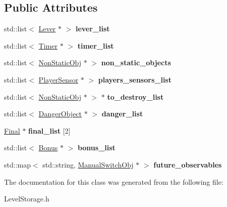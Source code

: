 \subsection*{Public Attributes}
\begin{DoxyCompactItemize}
\item 
\mbox{\label{class_storage_a183e52c6e96e3174e51b6ae47579ed55}} 
std\+::list$<$ \hyperlink{class_lever}{Lever} $\ast$ $>$ {\bfseries lever\+\_\+list}
\item 
\mbox{\label{class_storage_a9d200f7ba37543482bd1a50a54063ace}} 
std\+::list$<$ \hyperlink{class_timer}{Timer} $\ast$ $>$ {\bfseries timer\+\_\+list}
\item 
\mbox{\label{class_storage_af0e098198f6896d667ce135b5d81b7c1}} 
std\+::list$<$ \hyperlink{class_non_static_obj}{Non\+Static\+Obj} $\ast$ $>$ {\bfseries non\+\_\+static\+\_\+objects}
\item 
\mbox{\label{class_storage_a9003cf58d8b5c48ca1ac7d0ce7323238}} 
std\+::list$<$ \hyperlink{class_player_sensor}{Player\+Sensor} $\ast$ $>$ {\bfseries players\+\_\+sensors\+\_\+list}
\item 
\mbox{\label{class_storage_ad96cf086d9e0eb5b811504d26737f351}} 
std\+::list$<$ \hyperlink{class_non_static_obj}{Non\+Static\+Obj} $\ast$ $>$ $\ast$ {\bfseries to\+\_\+destroy\+\_\+list}
\item 
\mbox{\label{class_storage_a6cb1b8c7f32484e515530c7eb54ed08f}} 
std\+::list$<$ \hyperlink{class_danger_object}{Danger\+Object} $\ast$ $>$ {\bfseries danger\+\_\+list}
\item 
\mbox{\label{class_storage_aca489d11da5a79c4ada94fb89aebab69}} 
\hyperlink{class_final}{Final} $\ast$ {\bfseries final\+\_\+list} \mbox{[}2\mbox{]}
\item 
\mbox{\label{class_storage_a16492ba80ed615d1b917a12d8a959fed}} 
std\+::list$<$ \hyperlink{class_bonus}{Bonus} $\ast$ $>$ {\bfseries bonus\+\_\+list}
\item 
\mbox{\label{class_storage_a9ec3b712f9c20c9c2e82cc07f77ad692}} 
std\+::map$<$ std\+::string, \hyperlink{class_manual_switch_obj}{Manual\+Switch\+Obj} $\ast$ $>$ {\bfseries future\+\_\+observables}
\end{DoxyCompactItemize}


The documentation for this class was generated from the following file\+:\begin{DoxyCompactItemize}
\item 
Level\+Storage.\+h\end{DoxyCompactItemize}
